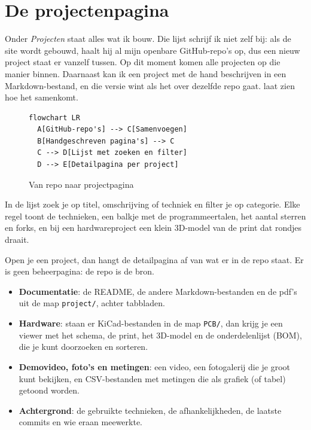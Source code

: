 \documentclass[11pt,a4paper]{article}
\begin{document}
\section{De projectenpagina}

Onder \emph{Projecten} staat alles wat ik bouw. Die lijst schrijf ik niet zelf bij: als de site wordt gebouwd, haalt hij al mijn openbare GitHub-repo's op, dus een nieuw project staat er vanzelf tussen. Op dit moment komen alle projecten op die manier binnen. Daarnaast kan ik een project met de hand beschrijven in een Markdown-bestand, en die versie wint als het over dezelfde repo gaat.  laat zien hoe het samenkomt.

\begin{figure}
\begin{lstlisting}[language=mermaid, title={Waar de projecten vandaan komen}]
flowchart LR
  A[GitHub-repo's] --> C[Samenvoegen]
  B[Handgeschreven pagina's] --> C
  C --> D[Lijst met zoeken en filter]
  D --> E[Detailpagina per project]
\end{lstlisting}
\caption{Van repo naar projectpagina}
\label{fig:projecten}
\end{figure}

In de lijst zoek je op titel, omschrijving of techniek en filter je op categorie. Elke regel toont de technieken, een balkje met de programmeertalen, het aantal sterren en forks, en bij een hardwareproject een klein 3D-model van de print dat rondjes draait.

Open je een project, dan hangt de detailpagina af van wat er in de repo staat. Er is geen beheerpagina: de repo is de bron.

\begin{itemize}
  \item \textbf{Documentatie}: de README, de andere Markdown-bestanden en de pdf's uit de map \texttt{project/}, achter tabbladen.
  \item \textbf{Hardware}: staan er KiCad-bestanden in de map \texttt{PCB/}, dan krijg je een viewer met het schema, de print, het 3D-model en de onderdelenlijst (BOM), die je kunt doorzoeken en sorteren.
  \item \textbf{Demovideo, foto's en metingen}: een video, een fotogalerij die je groot kunt bekijken, en CSV-bestanden met metingen die als grafiek (of tabel) getoond worden.
  \item \textbf{Achtergrond}: de gebruikte technieken, de afhankelijkheden, de laatste commits en wie eraan meewerkte.
\end{itemize}
\end{document}
